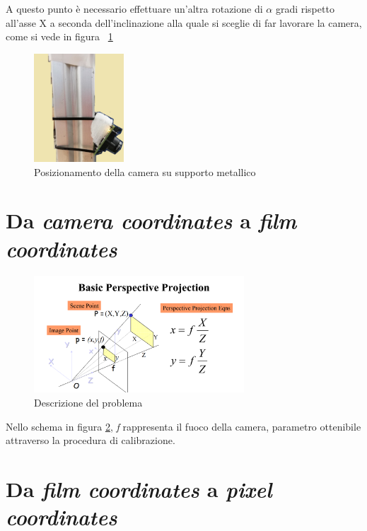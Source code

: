 A questo punto è necessario effettuare un'altra rotazione di $\alpha$ gradi rispetto all'asse X a seconda dell'inclinazione alla quale si sceglie di far lavorare la camera, come si vede in figura ~\ref{fig:cameraSupport}

\begin{figure}
	\centering
	\includegraphics[width=0.3\textwidth]{Immagini/CameraSupport.png}
	\caption{Posizionamento della camera su supporto metallico}
	\label{fig:cameraSupport}
\end{figure}

\section{Da \textit{camera coordinates} a \textit{film coordinates}}
\begin{figure}[H]
	\centering
	\includegraphics[width=0.7\textwidth]{Immagini/perspective_projection.png}
	\caption{Descrizione del problema}
	\label{fig:perspective_projection}
\end{figure}
Nello schema in figura \ref{fig:perspective_projection}, \textit{f} rappresenta il fuoco della camera, parametro ottenibile attraverso la procedura di calibrazione.

\section{Da \textit{film coordinates} a \textit{pixel coordinates}}

